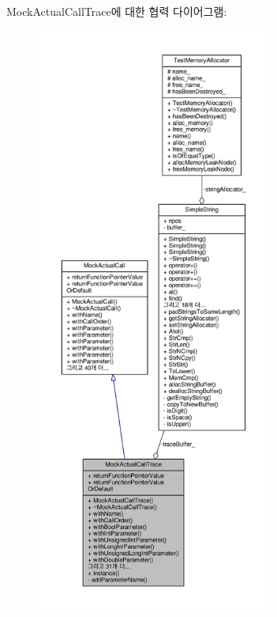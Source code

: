 Mock\+Actual\+Call\+Trace에 대한 협력 다이어그램\+:
\nopagebreak
\begin{figure}[H]
\begin{center}
\leavevmode
\includegraphics[height=550pt]{class_mock_actual_call_trace__coll__graph}
\end{center}
\end{figure}
